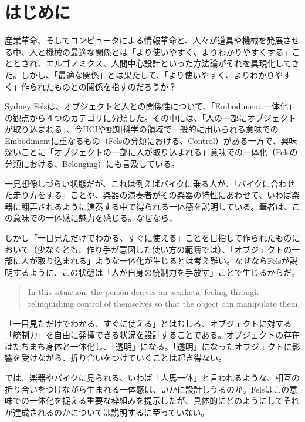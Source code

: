 \chapter{はじめに}
\label{introduction}

産業革命、そしてコンピュータによる情報革命と、人々が道具や機械を発展させる中、人と機械の最適な関係とは「より使いやすく、よりわかりやすくする」こととされ、エルゴノミクス、人間中心設計といった方法論がそれを具現化してきた。しかし、「最適な関係」とは果たして、「より使いやすく、よりわかりやすく」作られたものとの関係を指すのだろうか？

Sydney Felsは、オブジェクトと人との関係性について、「Embodiment:一体化」の観点から４つのカテゴリに分類した。その中には、「人の一部にオブジェクトが取り込まれる」、今HCIや認知科学の領域で一般的に用いられる意味でのEmbodimentに重なるもの（Felsの分類における、Control）がある一方で、興味深いことに「オブジェクトの一部に人が取り込まれる」意味での一体化（Felsの分類における、Belonging）にも言及している。

一見想像しづらい状態だが、これは例えばバイクに乗る人が、「バイクに合わせた走り方をする」ことや、楽器の演奏者がその楽器の特性にあわせて、いわば楽器に翻弄されるように演奏する中で得られる一体感を説明している。筆者は、この意味での一体感に魅力を感じる。なぜなら、

しかし「一目見ただけでわかる、すぐに使える」ことを目指して作られたものにおいて（少なくとも、作り手が意図した使い方の範疇では）、「オブジェクトの一部に人が取り込まれる」ような一体化が生じるとは考え難い。なぜならFelsが説明するように、この状態は「人が自身の統制力を手放す」ことで生じるからだ。
\begin{quote}
  In this situation, the person derives an aesthetic feeling through relinquishing control of themselves so that the object can manipulate them.
\end{quote}

「一目見ただけでわかる、すぐに使える」とはむしろ、オブジェクトに対する「統制力」を自由に発揮できる状況を設計することである。オブジェクトの存在はたちまち身体と一体化し、「透明」になる。「透明」になったオブジェクトに影響を受けながら、折り合いをつけていくことは起き得ない。

では、楽器やバイクに見られる、いわば「人馬一体」と言われるような、相互の折り合いをつけながら生まれる一体感は、いかに設計しうるのか。Felsはこの意味での一体化を捉える重要な枠組みを提示したが、具体的にどのようにしてそれが達成されるのかについては説明するに至っていない。

